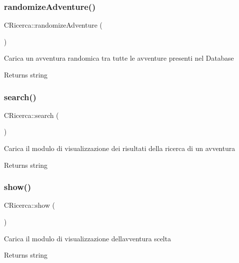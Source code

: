 \subsubsection{\texorpdfstring{randomize\+Adventure()}{randomizeAdventure()}}
{\footnotesize\ttfamily C\+Ricerca\+::randomize\+Adventure (\begin{DoxyParamCaption}{ }\end{DoxyParamCaption})}

Carica un avventura randomica tra tutte le avventure presenti nel Database

\begin{DoxyReturn}{Returns}
string 
\end{DoxyReturn}
\mbox{\label{class_c_ricerca_ad9db48dfeb34933bf9d12c911d2b34a4}} 
\subsubsection{\texorpdfstring{search()}{search()}}
{\footnotesize\ttfamily C\+Ricerca\+::search (\begin{DoxyParamCaption}{ }\end{DoxyParamCaption})}

Carica il modulo di visualizzazione dei risultati della ricerca di un avventura

\begin{DoxyReturn}{Returns}
string 
\end{DoxyReturn}
\mbox{\label{class_c_ricerca_a86b16017d05539bb20445d2bcff3b16a}} 
\subsubsection{\texorpdfstring{show()}{show()}}
{\footnotesize\ttfamily C\+Ricerca\+::show (\begin{DoxyParamCaption}{ }\end{DoxyParamCaption})}

Carica il modulo di visualizzazione dell\textquotesingle{}avventura scelta

\begin{DoxyReturn}{Returns}
string 
\end{DoxyReturn}
\mbox{\label{class_c_ricerca_ac96d19e55d037f65635a90579c76c84c}} 
